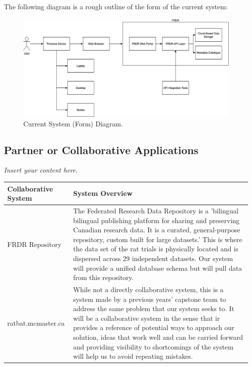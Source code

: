 \documentclass[12pt]{article}
\newcommand{\lips}{\textit{Insert your content here.}}
\begin{document}
\par{The following diagram is a rough outline of the form of the current system:}

\begin{figure}[H]
    \centering
    \includegraphics[width=1\textwidth]{3.2 Current System (Form) Diagram.png}
    \caption{Current System (Form) Diagram.}
    \label{fig:currentSysForm}
\end{figure}

\subsection{Partner or Collaborative Applications}
\lips

\begin{tabular}{|m{5cm}|m{10cm}|}
    \hline
    Collaborative System & System Overview \\
    \hline
    FRDR Repository & The Federated Research Data Repository is a 'bilingual bilingual publishing 
    platform for sharing and 
    preserving Canadian research data. 
    It is a curated, general-purpose repository, 
    custom built for large datasets.' This is where the data set of the rat trials is physically located
    and is dispersed across 29 independent datasets. Our system will provide a unified database schema but will
    pull data from this repository.\\
    \hline
    ratbat.mcmaster.ca & While not a directly collaborative system, this is a system made by a previous years' capstone
    team to address the same problem that our system seeks to. It will be a collaborative system in the sense that ir provides
    a reference of potential ways to approach our solution, ideas that work well and can be carried forward
    and providing visibility to shortcomings of the system will help us to avoid repeating mistakes. \\
    \hline
\end{tabular}
\end{document}
